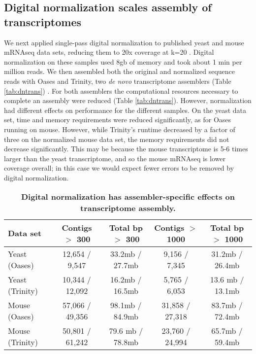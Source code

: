 \subsection{Digital normalization scales assembly of transcriptomes}


We next applied single-pass digital normalization to published yeast and mouse
mRNAseq data sets, reducing them to 20x coverage at k=20 \cite{pubmed21572440}.
Digital normalization on these samples used 8gb of memory and took about 1 min
per million reads.  We then assembled both the original and normalized sequence
reads with Oases and Trinity, two {\em de novo} transcriptome assemblers (Table
\ref{tab:dntrans}) \cite{pubmed22368243,pubmed21572440}.
%
For both assemblers the computational resources necessary to complete an
assembly were reduced (Table \ref{tab:dntrans}). However, normalization had
different effects on performance for the different samples.  On the yeast data
set, time and memory requirements were reduced significantly, as for Oases
running on mouse.  However, while Trinity's runtime decreased by a factor of
three on the normalized mouse data set, the memory requirements did not
decrease significantly.  This may be because the mouse transcriptome is 5-6
times larger than the yeast transcriptome, and so the mouse mRNAseq is lower
coverage overall; in this case we would expect fewer errors to be removed by
digital normalization.


\begin{table}[!ht]
\centering
\resizebox{16cm}{!} {



\begin{tabular}{|l|c|c|c|c|}
\hline
Data set & Contigs $>$ 300 & Total bp $>$ 300 & Contigs $>$ 1000 & Total bp $>$ 1000 \\
\hline 
Yeast (Oases) & 12,654 / 9,547 & 33.2mb / 27.7mb & 9,156 / 7,345 & 31.2mb / 26.4mb \\
Yeast (Trinity) & 10,344 / 12,092 & 16.2mb / 16.5mb & 5,765 / 6,053 & 13.6 mb / 13.1mb \\
Mouse (Oases) & 57,066 / 49,356 & 98.1mb / 84.9mb & 31,858 / 27,318 & 83.7mb / 72.4mb \\
Mouse (Trinity) & 50,801 / 61,242 & 79.6 mb / 78.8mb & 23,760 / 24,994 & 65.7mb / 59.4mb \\
\hline
\end{tabular}
}
\caption{
\bf{Digital normalization has assembler-specific effects on transcriptome
assembly.}}

\label{tab:dntrans0}
\end{table}


